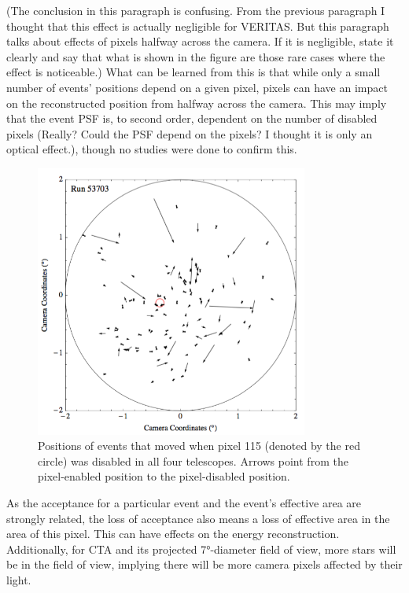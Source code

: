     {\color{red}(The conclusion in this paragraph is confusing. From the previous paragraph I thought that this effect is actually negligible for VERITAS. But this paragraph talks about effects of pixels halfway across the camera. If it is negligible, state it clearly and say that what is shown in the figure are those rare cases where the effect is noticeable.)}
    What can be learned from this is that while only a small number of events' positions depend on a given pixel, pixels can have an impact on the reconstructed position from halfway across the camera.
    This may imply that the event PSF is, to second order, dependent on the number of disabled pixels {\color{red}(Really? Could the PSF depend on the pixels? I thought it is only an optical effect.)}, though no studies were done to confirm this.


    \begin{figure}[ht]
      \centering
      \includegraphics[width=0.8\textwidth]{images/disabled_pixel/moving_events}
      \caption[Event Movement]{
        Positions of events that moved when pixel 115 (denoted by the red circle) was disabled in all four telescopes.  
        Arrows point from the pixel-enabled position to the pixel-disabled position.
      }
      \label{fig:dpix_move}
    \end{figure}

    As the acceptance for a particular event and the event's effective area are strongly related, the loss of acceptance also means a loss of effective area in the area of this pixel.
    This can have effects on the energy reconstruction.
    Additionally, for CTA and its projected \ang{7}-diameter field of view, more stars will be in the field of view, implying there will be more camera pixels affected by their light.
    
